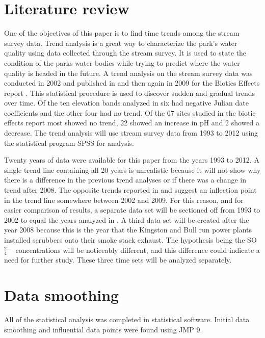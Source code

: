 \section{Literature review}
One of the objectives of this paper is to find time trends among the stream survey data.
Trend analysis is a great way to characterize the park's water quality using data collected through the stream survey.
It is used to state the condition of the parks water bodies while trying to predict where the water quality is headed in the future. 
A trend analysis on the stream survey data was conducted in 2002 and published in \citet{robinson2008ph} and then again in 2009 for the Biotics Effects report \citep{cai2012}. 
 This statistical procedure is used to discover sudden and gradual trends over time.
Of the ten elevation bands analyzed in \citet{robinson2008ph} six had negative Julian date coefficients and the other four had no trend. 
Of the 67 sites studied in the biotic effects report most showed no trend, 22 showed an increase in pH and 2 showed a decrease\citep{cai2012}. 
The trend analysis will use stream survey data from 1993 to 2012 using the statistical program SPSS for analysis.

Twenty years of data were available for this paper from the years 1993 to 2012.  
A single trend line containing all 20 years is unrealistic because it will not show why there is a difference in the previous trend analyses or if there was a change in trend after 2008. 
The opposite trends reported in  \citet{robinson2008ph} and \citet{cai2012} suggest an inflection point in the trend line somewhere between 2002 and 2009. 
For this reason, and for easier comparison of results,  a separate data set will be sectioned off from 1993 to 2002 to equal the years analyzed in \citet{robinson2008ph}.  
A third data set will be created after the year 2008 because this is the year that the Kingston and Bull run power plants installed scrubbers onto their smoke stack exhaust. 
The hypothesis being the SO$_4^{2-}$ concentrations will be noticeably different, and this difference could indicate a need for further study. 
These three time sets will be analyzed separately.

\section{Data smoothing}

All of the statistical analysis was completed in statistical software. 
Initial data smoothing and influential data points were found using JMP 9. 

